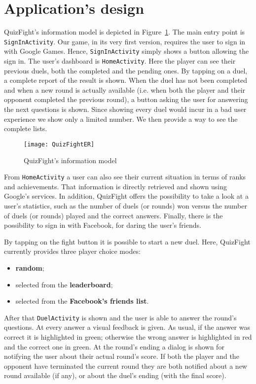 \section{Application's design}
QuizFight's information model is depicted in Figure~\ref{fig:quizfighter}. The main entry point is \texttt{SignInActivity}. Our game, in its very first version, requires the user to sign in with Google Games. Hence, \texttt{SignInActivity} simply shows a button allowing the sign in. The user's dashboard is \texttt{HomeActivity}. Here the player can see their previous duels, both the completed and the pending ones. By tapping on a duel, a complete report of the result is shown. When the duel has not been completed and when a new round is actually available (i.e. when both the player and their opponent completed the previous round), a button asking the user for answering the next questions is shown. Since showing every duel would incur in a bad user experience we show only a limited number. We then provide a way to see the complete lists.
\begin{figure}[t]
	\centering
	\texttt{[image: QuizFightER]}
	\caption{QuizFight's information model}
	\label{fig:quizfighter}
\end{figure}

From \texttt{HomeActivity} a user can also see their current situation in terms of ranks and achievements. That information is directly retrieved and shown using Google's services. In addition, QuizFight offers the possibility to take a look at a user's statistics, such as the number of duels (or rounds) won versus the number of duels (or rounds) played and the correct answers. Finally, there is the possibility to sign in with Facebook, for daring the user's friends.

By tapping on the fight button it is possible to start a new duel. Here, QuizFight currently provides three player choice modes: 
\begin{itemize}
	\item \textbf{random};
	\item selected from the \textbf{leaderboard};
	\item selected from the \textbf{Facebook's friends list}.
\end{itemize}

After that \texttt{DuelActivity} is shown and the user is able to answer the round's questions. At every answer a visual feedback is given. As usual, if the answer was correct it is highlighted in green; otherwise the wrong answer is highlighted in red and the correct one in green. At the round's ending a dialog is shown for notifying the user about their actual round's score. If both the player and the opponent have terminated the current round they are both notified about a new round available (if any), or about the duel's ending (with the final score). 
